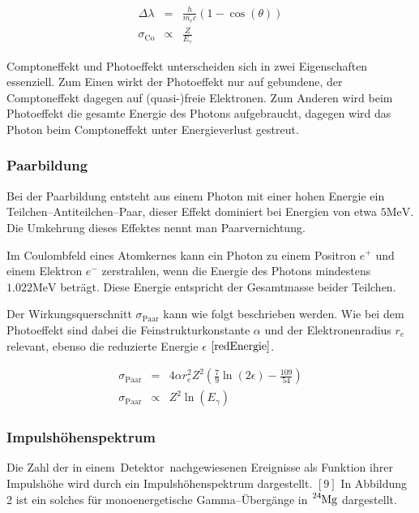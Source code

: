 \documentclass[12pt,a4paper]{scrartcl}
\numberwithin{equation}{section} %
\newcommand{\pu}[1]{\ensuremath{\mathrm{#1}}}
\renewcommand{\[}{} %
\renewcommand{\]}{\noindent} %
\begin{document}
\[
\begin{eqnarray}
    \Delta \lambda &=& \frac{h}{m_e c} (1 - \cos(\theta)) \\
    \sigma_\mathrm{Co} &\propto & \frac{Z}{E_\gamma}
\end{eqnarray}
\]

Comptoneffekt und Photoeffekt unterscheiden sich in zwei Eigenschaften
essenziell. Zum Einen wirkt der Photoeffekt nur auf gebundene, der
Comptoneffekt dagegen auf (quasi-)freie Elektronen. Zum Anderen wird
beim Photoeffekt die gesamte Energie des Photons aufgebraucht, dagegen
wird das Photon beim Comptoneffekt unter Energieverlust gestreut.

\hypertarget{paarbildung}{%
\subsubsection{Paarbildung}\label{paarbildung}}

Bei der Paarbildung entsteht aus einem Photon mit einer hohen Energie
ein Teilchen--Antiteilchen--Paar, dieser Effekt dominiert bei Energien
von etwa \(\pu{5 MeV}\). Die Umkehrung dieses Effektes nennt man
Paarvernichtung.

Im Coulombfeld eines Atomkernes kann ein Photon zu einem Positron
\(e^+\) und einem Elektron \(e^-\) zerstrahlen, wenn die Energie des
Photons mindestens \(\pu{1.022 MeV}\) beträgt. Diese Energie entspricht
der Gesamtmasse beider Teilchen.

Der Wirkungsquerschnitt \(\sigma_\mathrm{Paar}\) kann wie folgt
beschrieben werden. Wie bei dem Photoeffekt sind dabei die
Feinstrukturkonstante \(\alpha\) und der Elektronenradius \(r_e\)
relevant, ebenso die reduzierte Energie \(\epsilon\)
\(\eqref{redEnergie}\).

\[
\begin{eqnarray}
    \sigma_\mathrm{Paar}
        &=& 4\alpha r_e^2 Z^2
            \left(\frac{7}{9} \ln(2\epsilon) - \frac{109}{54} \right) \\
    \sigma_\mathrm{Paar}
        &\propto& Z^2 \ln(E_\gamma)
\end{eqnarray}
\]

\hypertarget{impulshuxf6henspektrum}{%
\subsubsection{Impulshöhenspektrum}\label{impulshuxf6henspektrum}}

Die Zahl der in einem~Detektor~nachgewiesenen Ereignisse als Funktion
ihrer Impulshöhe wird durch ein Impulshöhenspektrum dargestellt. \([9]\)
In Abbildung 2 ist ein solches für monoenergetische Gamma--Übergänge in
\(\ce{^{24}Mg}\) dargestellt.
\end{document}
